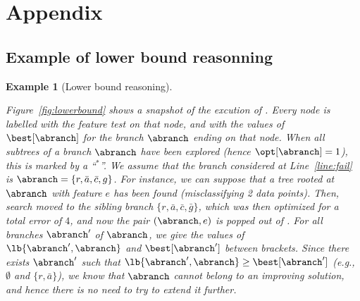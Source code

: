 \documentclass{article}
\newtheorem{example}{Example}
\begin{document}

\appendix

\section{Appendix}


\subsection{Example of lower bound reasonning}

\begin{example}[Lower bound reasoning]
	\label{ex:lb}


	Figure~\ref{fig:lowerbound} shows a snapshot of the excution of \budalg. Every node is labelled with the feature test on that node, and with the values of $\best[\abranch]$ for the branch $\abranch$ ending on that node. When all subtrees of a branch $\abranch$ have been explored (hence $\opt[\abranch]=1$), this is marked by a ``$^*$''. We assume that the branch considered at Line~\ref{line:fail} is $\abranch = \{r, \bar{a}, \bar{c}, g\}$. For instance, we can suppose that a tree rooted at $\abranch$ with feature $e$ has been found (misclassifying 2 data points). Then, search moved to the sibling branch $\{r, \bar{a}, \bar{c}, \bar{g}\}$, which was then optimized for a total error of $4$, and now the pair $(\abranch,e)$ is popped out of \sequence. For all branches $\abranch'$ of $\abranch$, we give the values of $\lb{\abranch',\abranch}$ and $\best[\abranch']$ between brackets. Since there exists $\abranch'$ such that $\lb{\abranch',\abranch} \geq \best[\abranch']$ (e.g., $\emptyset$ and $\{r, \bar{a}\}$), we know that $\abranch$ cannot belong to an improving solution, and hence there is no need to try to extend it further.




\end{example}
\end{document}
